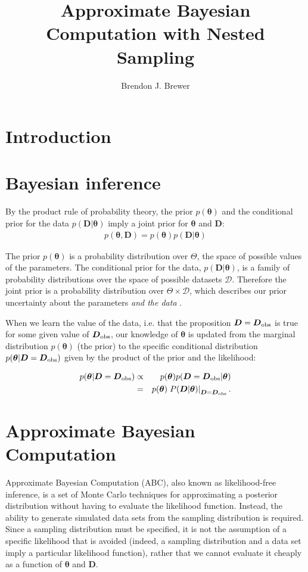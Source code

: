 \documentclass[a4paper, 11pt]{article}
\title{Approximate Bayesian Computation with Nested Sampling}
\author{Brendon J. Brewer}
\newcommand{\params}{\boldsymbol{\theta}}	%
\newcommand{\data}{\boldsymbol{D}}  %
\newcommand{\dobs}{\boldsymbol{D}_{\rm obs}} %
\begin{document}
\maketitle

\section{Introduction}


\section{Bayesian inference}
By the product rule of probability theory, the prior $p(\params)$ and the
conditional prior for the data $p(\data | \params)$ imply a joint prior
for $\params$ and $\data$:
\begin{equation}
\begin{array}{lr}
p(\params, \data) = p(\params)p(\data|\params)
\end{array}
\end{equation}

The prior $p(\params)$ is a probability distribution over $\Theta$, the space
of possible values of the parameters. The conditional prior for the data,
$p(\data | \params)$, is a family of probability distributions over the space
of possible datasets $\mathcal{D}$. Therefore the joint prior is a probability
distribution over $\Theta \times \mathcal{D}$, which describes our prior
uncertainty about the parameters {\it and the data} \citep{caticha}.

When we learn the value of the data, i.e. that the proposition
$\data = \dobs$ is true for some given value of $\dobs$, our knowledge of
$\params$ is updated from the marginal distribution $p(\params)$ (the prior)
to the specific conditional distribution $p(\params | \data=\dobs)$ given by
the product of the prior and the likelihood:

\begin{eqnarray}
p(\params | \data=\dobs) &\propto& p(\params)p(\data=\dobs | \params)\\
&=& p(\params)\left.P(\data | \params)\right|_{\data=\dobs}.
\end{eqnarray}

\section{Approximate Bayesian Computation}
Approximate Bayesian Computation (ABC), also known as likelihood-free inference,
is a set of Monte Carlo techniques for approximating a posterior distribution
without having to evaluate the likelihood function. Instead, the ability to
generate simulated data sets from the sampling distribution is required.
Since a sampling distribution must be specified, it is not the assumption of
a specific likelihood that is avoided (indeed, a sampling distribution and
a data set imply a particular likelihood function), rather that we cannot
evaluate it cheaply as a function of $\params$ and $\data$.
\end{document}
